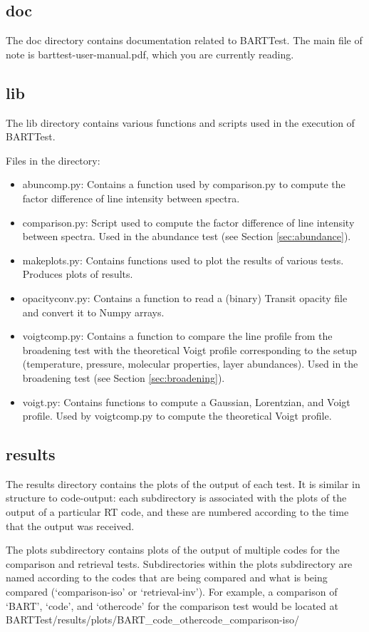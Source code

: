 \documentclass[letterpaper, 12pt]{article}
\begin{document}
\subsection{doc}
The doc directory contains documentation related to BARTTest. The main file 
of note is barttest-user-manual.pdf, which you are currently reading.

\subsection{lib}
The lib directory contains various functions and scripts used in the execution 
of BARTTest.

Files in the directory:
\begin{itemize} \itemsep0pt
\item abuncomp.py: Contains a function used by comparison.py to compute the factor 
difference of line intensity between spectra.
\item comparison.py: Script used to compute the factor difference of line 
intensity between spectra.  Used in the abundance test (see 
Section \ref{sec:abundance}).
\item makeplots.py: Contains functions used to plot the results of various 
tests. Produces plots of results.
\item opacityconv.py: Contains a function to read a (binary) Transit opacity file 
and convert it to Numpy arrays.
\item voigtcomp.py: Contains a function to compare the line profile from the 
broadening test with the theoretical Voigt profile corresponding to the 
setup (temperature, pressure, molecular properties, layer abundances). 
Used in the broadening test (see Section \ref{sec:broadening}).
\item voigt.py: Contains functions to compute a Gaussian, Lorentzian, and Voigt 
profile. Used by voigtcomp.py to compute the theoretical Voigt profile.
\end{itemize}

\subsection{results}
\label{sec:results}
The results directory contains the plots of the output of each test. It is 
similar in structure to code-output: each subdirectory is associated with 
the plots of the output of a particular RT code, and these are numbered 
according to the time that the output was received. 

The plots subdirectory contains plots of the output of multiple codes for 
the comparison and retrieval tests. Subdirectories within the plots 
subdirectory are named according to the codes that are being compared and 
what is being compared (`comparison-iso' or `retrieval-inv'). For example, a 
comparison of `BART', `code', and `othercode' for the comparison test would 
be located at BARTTest/results/plots/BART{\_}code{\_}othercode{\_}comparison-iso/
\end{document}

